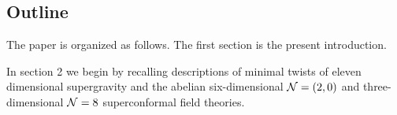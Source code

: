 
\subsection{Outline}

The paper is organized as follows. The first section is the present introduction.

In section 2 we begin by recalling descriptions of minimal twists of eleven dimensional supergravity \cite{} and the abelian six-dimensional $\mathcal N=(2,0)$ \cite{} and three-dimensional $\mathcal N=8$ \cite{} superconformal field theories.

%
